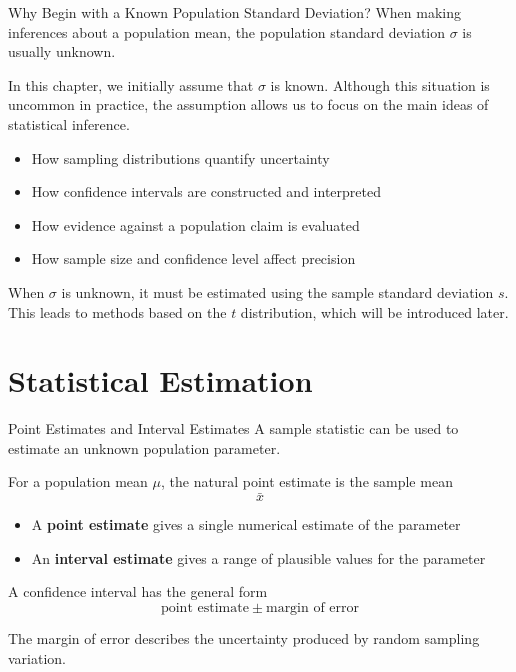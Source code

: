 \documentclass[aspectratio=169]{beamer}
\begin{document}
\begin{frame}{Why Begin with a Known Population Standard Deviation?}
When making inferences about a population mean, the population standard deviation $\sigma$ is usually unknown.

\vspace{0.2cm}
In this chapter, we initially assume that $\sigma$ is known. Although this situation is uncommon in practice, the assumption allows us to focus on the main ideas of statistical inference.
\begin{itemize}
  \item How sampling distributions quantify uncertainty
  \item How confidence intervals are constructed and interpreted
  \item How evidence against a population claim is evaluated
  \item How sample size and confidence level affect precision
\end{itemize}

\vspace{0.15cm}
When $\sigma$ is unknown, it must be estimated using the sample standard deviation $s$. This leads to methods based on the $t$ distribution, which will be introduced later.
\end{frame}

\section{Statistical Estimation}

\begin{frame}{Point Estimates and Interval Estimates}
A sample statistic can be used to estimate an unknown population parameter.

\vspace{0.2cm}
For a population mean $\mu$, the natural point estimate is the sample mean
$$\bar{x}$$

\begin{itemize}
	\item A \textbf{point estimate} gives a single numerical estimate of the parameter
  	\item An \textbf{interval estimate} gives a range of plausible values for the parameter
\end{itemize}

\vspace{0.2cm}
A confidence interval has the general form
$$\text{point estimate}\ \pm\ \text{margin of error}$$

The margin of error describes the uncertainty produced by random sampling variation.
\end{frame}
\end{document}
